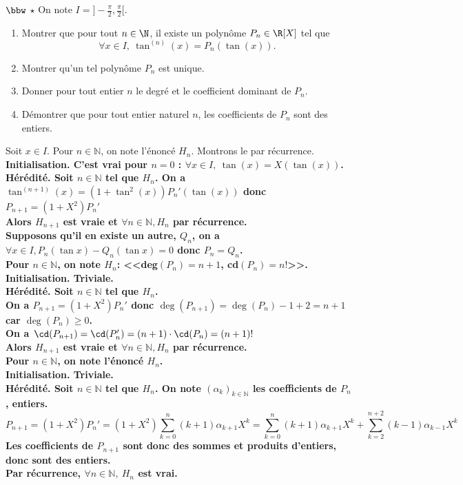 \documentclass[11pt]{article}
\begin{document}
\begin{exercice}{$\bbw$ $\star$}{}
    On note $I=]-\frac{\pi}{2},\frac{\pi}{2}[$.
    \begin{enumerate}
        \item Montrer que pour tout $n\in\N$, il existe un polynôme $P_n\in\R[X]$ tel que
        \begin{equation*}
            \forall x \in I, ~ \tan^{(n)}(x)=P_n(\tan(x)).
        \end{equation*}
        \item Montrer qu'un tel polynôme $P_n$ est unique.
        \item Donner pour tout entier $n$ le degré et le coefficient dominant de $P_n$.
        \item Démontrer que pour tout entier naturel $n$, les coefficients de $P_n$ sont des entiers.
    \end{enumerate}
    \tcblower
    \boxed{\star} Soit $x\in I$. Pour $n\in\mathbb{N}$, on note l'énoncé $H_n$. Montrons le par récurrence.\\
    \bf{Initialisation.} C'est vrai pour $n=0$ : $\forall x\in I, ~ \tan(x)=X(\tan(x))$.\\
    \bf{Hérédité.} Soit $n\in\mathbb{N}$ tel que $H_n$. On a $\tan^{(n+1)}(x)=(1+\tan^2(x))P_n'(\tan(x))$ donc $P_{n+1}=(1+X^2)P_n'$\\
    Alors $H_{n+1}$ est vraie et $\forall n\in\mathbb{N}, H_n$ par récurrence.\\
     Supposons qu'il en existe un autre, $Q_n$, on a $\forall x\in I, P_n(\tan x) - Q_n(\tan x) = 0$ donc $P_n=Q_n$.\\
     Pour $n\in\mathbb{N}$, on note $H_n$: <<deg$(P_n)=n+1$, cd$(P_n)=n!$>>.\\
    \bf{Initialisation.} Triviale.\\
    \bf{Hérédité.} Soit $n\in\mathbb{N}$ tel que $H_n$.\\
    On a $P_{n+1}=(1+X^2)P_n'$ donc $\deg(P_{n+1})=\deg(P_n)-1+2=n+1$ car $\deg(P_n)\geq0$.\\
    On a $\cd(P_{n+1})=\cd(P_n')=(n+1)\cdot\cd(P_n)=(n+1)!$\\
    Alors $H_{n+1}$ est vraie et $\forall n \in \mathbb{N}, H_n$ par récurrence.\\
     Pour $n\in\mathbb{N}$, on note l'énoncé $H_n$.\\
    \bf{Initialisation.} Triviale.\\
    \bf{Hérédité.} Soit $n\in\mathbb{N}$ tel que $H_n$. On note $(\alpha_k)_{k\in\mathbb{N}}$ les coefficients de $P_n$, entiers.
    \begin{equation*}P_{n+1}=(1+X^2)P_n'=(1+X^2)\sum\limits_{k=0}^{n}(k+1)\alpha_{k+1}X^{k}=\sum\limits_{k=0}^n(k+1)\alpha_{k+1}X^k+\sum\limits_{k=2}^{n+2}(k-1)\alpha_{k-1}X^{k}\end{equation*}
    Les coefficients de $P_{n+1}$ sont donc des sommes et produits d'entiers, donc sont des entiers.\\
    Par récurrence, $\forall{n\in\mathbb{N}}, ~ H_n$ est vrai.
\end{exercice}
\end{document}
